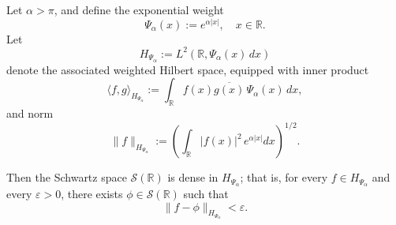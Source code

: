 \begin{lemma}\label{lem:density_schwartz_weighted_L2}
Let \( \alpha > \pi \), and define the exponential weight
\[
\Psi_\alpha(x) := e^{\alpha |x|}, \quad x \in \mathbb{R}.
\]
Let
\[
H_{\Psi_\alpha} := L^2(\mathbb{R}, \Psi_\alpha(x)\, dx)
\]
denote the associated weighted Hilbert space, equipped with inner product
\[
\langle f, g \rangle_{H_{\Psi_\alpha}} := \int_{\mathbb{R}} f(x) \overline{g(x)}\, \Psi_\alpha(x)\, dx,
\]
and norm
\[
\|f\|_{H_{\Psi_\alpha}} := \left( \int_{\mathbb{R}} |f(x)|^2\, e^{\alpha |x|} dx \right)^{1/2}.
\]

Then the Schwartz space \( \mathcal{S}(\mathbb{R}) \) is dense in \( H_{\Psi_\alpha} \); that is, for every \( f \in H_{\Psi_\alpha} \) and every \( \varepsilon > 0 \), there exists \( \phi \in \mathcal{S}(\mathbb{R}) \) such that
\[
\| f - \phi \|_{H_{\Psi_\alpha}} < \varepsilon.
\]
\end{lemma}
% 